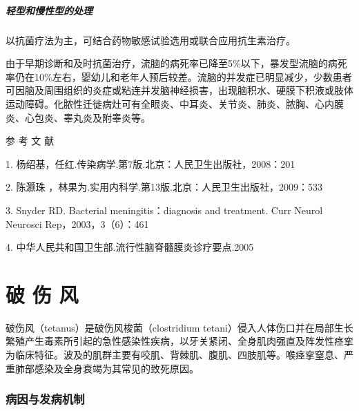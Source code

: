 \paragraph{轻型和慢性型的处理}

以抗菌疗法为主，可结合药物敏感试验选用或联合应用抗生素治疗。

由于早期诊断和及时抗菌治疗，流脑的病死率已降至5\%以下，暴发型流脑的病死率仍在10\%左右，婴幼儿和老年人预后较差。流脑的并发症已明显减少，少数患者可因脑及周围组织的炎症或粘连并发脑神经损害，出现脑积水、硬膜下积液或肢体运动障碍。化脓性迁徙病灶可有全眼炎、中耳炎、关节炎、肺炎、脓胸、心内膜炎、心包炎、睾丸炎及附睾炎等。

\protect\hypertarget{text00232.html}{}{}

\hypertarget{text00232.htmlux5cux23CHP7-11-4}{}
参 考 文 献

1. 杨绍基，任红.传染病学.第7版.北京：人民卫生出版社，2008：201

2. 陈灏珠 ，林果为.实用内科学.第13版.北京：人民卫生出版社，2009：533

3. Snyder RD. Bacterial meningitis：diagnosis and treatment. Curr Neurol
Neurosci Rep，2003，3（6）：461

4. 中华人民共和国卫生部.流行性脑脊髓膜炎诊疗要点.2005

\protect\hypertarget{text00233.html}{}{}

\chapter{破 伤 风}

破伤风（tetanus）是破伤风梭菌（clostridium
tetani）侵入人体伤口并在局部生长繁殖产生毒素所引起的急性感染性疾病，以牙关紧闭、全身肌肉强直及阵发性痉挛为临床特征。波及的肌群主要有咬肌、背棘肌、腹肌、四肢肌等。喉痉挛窒息、严重肺部感染及全身衰竭为其常见的致死原因。

\subsection{病因与发病机制}

